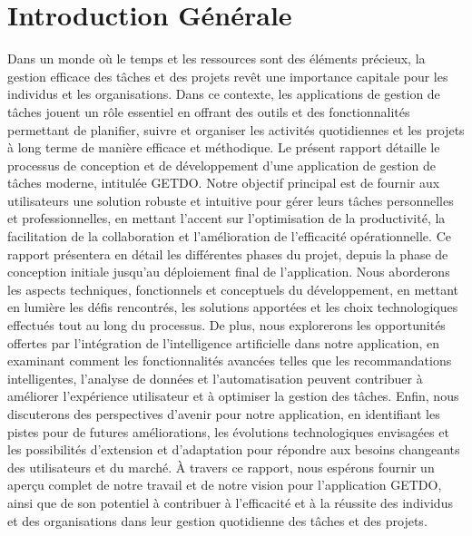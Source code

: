 \documentclass[a4paper,12pt]{report}
\begin{document}
\chapter*{Introduction Générale}
Dans un monde où le temps et les ressources sont des éléments précieux, la gestion efficace des tâches et des projets revêt une importance capitale pour les individus et les organisations. Dans ce contexte, les applications de gestion de tâches jouent un rôle essentiel en offrant des outils et des fonctionnalités permettant de planifier, suivre et organiser les activités quotidiennes et les projets à long terme de manière efficace et méthodique.
Le présent rapport détaille le processus de conception et de développement d'une application de gestion de tâches moderne, intitulée GETDO. Notre objectif principal est de fournir aux utilisateurs une solution robuste et intuitive pour gérer leurs tâches personnelles et professionnelles, en mettant l'accent sur l'optimisation de la productivité, la facilitation de la collaboration et l'amélioration de l'efficacité opérationnelle.
Ce rapport présentera en détail les différentes phases du projet, depuis la phase de conception initiale jusqu'au déploiement final de l'application. Nous aborderons les aspects techniques, fonctionnels et conceptuels du développement, en mettant en lumière les défis rencontrés, les solutions apportées et les choix technologiques effectués tout au long du processus.
De plus, nous explorerons les opportunités offertes par l'intégration de l'intelligence artificielle dans notre application, en examinant comment les fonctionnalités avancées telles que les recommandations intelligentes, l'analyse de données et l'automatisation peuvent contribuer à améliorer l'expérience utilisateur et à optimiser la gestion des tâches.
Enfin, nous discuterons des perspectives d'avenir pour notre application, en identifiant les pistes pour de futures améliorations, les évolutions technologiques envisagées et les possibilités d'extension et d'adaptation pour répondre aux besoins changeants des utilisateurs et du marché.
À travers ce rapport, nous espérons fournir un aperçu complet de notre travail et de notre vision pour l'application GETDO, ainsi que de son potentiel à contribuer à l'efficacité et à la réussite des individus et des organisations dans leur gestion quotidienne des tâches et des projets.

\end{document}
